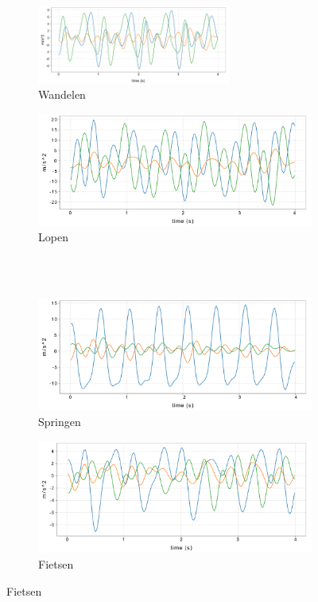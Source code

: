 \documentclass{article}
\begin{document}
\begin{figure}[h!]
  \begin{subfigure}[b]{.49\linewidth}
    \centering
    \includegraphics[width=0.70\textwidth]{figures/wandelen}
    \caption{Wandelen}\label{fig:1a}
  \end{subfigure}%
  \begin{subfigure}[b]{.49\linewidth}
    \centering
    \includegraphics[width=.70\textwidth]{figures/lopen}
    \caption{Lopen}\label{fig:1b}
  \end{subfigure} \\~\\
  \begin{subfigure}[b]{.49\linewidth}
    \centering
    \includegraphics[width=.70\textwidth]{figures/springen}
    \caption{Springen}\label{fig:1c}
  \end{subfigure}
  \begin{subfigure}[b]{.49\linewidth}
    \centering
    \includegraphics[width=.70\textwidth]{figures/fietsen}
    \caption{Fietsen}\label{fig:1d}

\end{subfigure}
\end{figure}
\end{document}
